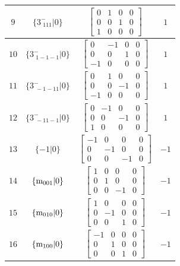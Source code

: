 \documentclass[fleqn,8pt]{jsarticle}
\begin{document}
\begin{longtable}{cccc}
$ 9 $ & $ \{3^{-}_{\,\,111}|0\} $ & $ \begin{bmatrix} 0 & 1 & 0 & 0 \\ 0 & 0 & 1 & 0 \\ 1 & 0 & 0 & 0 \end{bmatrix} $ & $ 1 $ \\ \hline
$ 10 $ & $ \{3^{-}_{\,\,1-1-1}|0\} $ & $ \begin{bmatrix} 0 & -1 & 0 & 0 \\ 0 & 0 & 1 & 0 \\ -1 & 0 & 0 & 0 \end{bmatrix} $ & $ 1 $ \\ \hline
$ 11 $ & $ \{3^{-}_{\,\,-1-11}|0\} $ & $ \begin{bmatrix} 0 & 1 & 0 & 0 \\ 0 & 0 & -1 & 0 \\ -1 & 0 & 0 & 0 \end{bmatrix} $ & $ 1 $ \\ \hline
$ 12 $ & $ \{3^{-}_{\,\,-11-1}|0\} $ & $ \begin{bmatrix} 0 & -1 & 0 & 0 \\ 0 & 0 & -1 & 0 \\ 1 & 0 & 0 & 0 \end{bmatrix} $ & $ 1 $ \\ \hline
$ 13 $ & $ \{-1|0\} $ & $ \begin{bmatrix} -1 & 0 & 0 & 0 \\ 0 & -1 & 0 & 0 \\ 0 & 0 & -1 & 0 \end{bmatrix} $ & $ -1 $ \\ \hline
$ 14 $ & $ \{{\rm m}_{001}|0\} $ & $ \begin{bmatrix} 1 & 0 & 0 & 0 \\ 0 & 1 & 0 & 0 \\ 0 & 0 & -1 & 0 \end{bmatrix} $ & $ -1 $ \\ \hline
$ 15 $ & $ \{{\rm m}_{010}|0\} $ & $ \begin{bmatrix} 1 & 0 & 0 & 0 \\ 0 & -1 & 0 & 0 \\ 0 & 0 & 1 & 0 \end{bmatrix} $ & $ -1 $ \\ \hline
$ 16 $ & $ \{{\rm m}_{100}|0\} $ & $ \begin{bmatrix} -1 & 0 & 0 & 0 \\ 0 & 1 & 0 & 0 \\ 0 & 0 & 1 & 0 \end{bmatrix} $ & $ -1 $ \\ \hline

\end{longtable}
\end{document}
